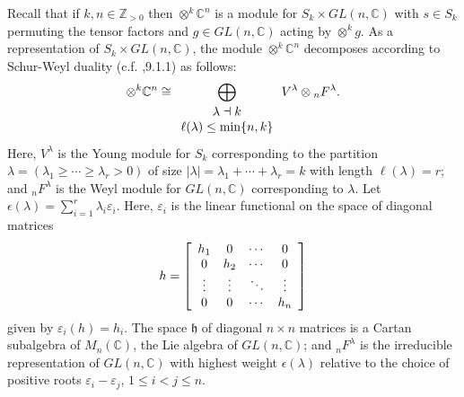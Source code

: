\documentclass[12pt]{article}%
\begin{document}
Recall that if $k,n\in\mathbb{Z}_{>0}$ then $\otimes^{k}\mathbb{C}^{n}$ is a
module for $S_{k}\times GL(n,\mathbb{C})$ with $s\in S_{k}$ permuting the
tensor factors and $g\in GL(n,\mathbb{C})$ acting by $\otimes^{k}g$. As a
representation of $S_{k}\times GL(n,\mathbb{C})$, the module $\otimes
^{k}\mathbb{C}^{n}$ decomposes according to Schur-Weyl duality (c.f.
\cite{GW},9.1.1) as follows:
\[
\otimes^{k}\mathbb{C}^{n}\cong\bigoplus_{%
\begin{array}
[c]{c}%
\lambda\dashv k\\
\ell(\lambda)\leq\min\{n,k\}
\end{array}
}V^{\lambda}\otimes{}_{n}F^{\lambda}.
\]
Here, $V^{\lambda}$ is the Young module for $S_{k}$ corresponding to the
partition $\lambda=(\lambda_{1}\geq\cdots\geq\lambda_{r}>0)$ of size
$|\lambda|=\lambda_{1}+\cdots+\lambda_{r}=k$ with length $\ell(\lambda)=r$;
and ${}_{n}F^{\lambda}$ is the Weyl module for $GL(n,\mathbb{C})$
corresponding to $\lambda$. Let $\epsilon(\lambda)=\sum_{i=1}^{r}\lambda
_{i}\varepsilon_{i}$. Here, $\varepsilon_{i}$ is the linear functional on the
space of diagonal matrices
\[
h=\left[
\begin{array}
[c]{cccc}%
h_{1} & 0 & \cdots & 0\\
0 & h_{2} & \cdots & 0\\
\vdots & \vdots & \ddots & \vdots\\
0 & 0 & \cdots & h_{n}%
\end{array}
\right]
\]
given by $\varepsilon_{i}(h)=h_{i}$. The space $\mathfrak{h}$ of diagonal
$n\times n$ matrices is a Cartan subalgebra of $M_{n}(\mathbb{C})$, the Lie
algebra of $GL(n,\mathbb{C})$; and ${}_{n}F^{\lambda}$ is the irreducible
representation of $GL(n,\mathbb{C})$ with highest weight $\epsilon(\lambda)$
relative to the choice of positive roots $\varepsilon_{i}-\varepsilon_{j}$,
$1\leq i<j\leq n$. 
\end{document}
